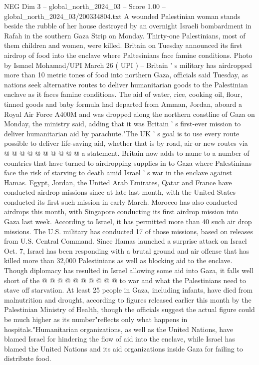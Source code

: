 \begin{textsample}{NEG Dim 3 – global\_north\_2024\_03 – Score 1.00 – global\_north\_2024\_03/200334804.txt}  \label{ex:f3_neg_170}
A wounded Palestinian woman stands beside the rubble of her house destroyed by an overnight Israeli bombardment in Rafah in the southern Gaza Strip on Monday.
Thirty-one Palestinians, most of them children and women, were killed.
Britain on Tuesday announced its first airdrop of food into the enclave where Paltesinians face famine conditions.
Photo by Ismael Mohamad/UPI March 26 ( UPI ) -- Britain ' s military has airdropped more than 10 metric tones of food into northern Gaza, officials said Tuesday, as nations seek alternative routes to deliver humanitarian goods to the Palestinian enclave as it faces famine conditions.
The aid of water, rice, cooking oil, flour, tinned goods and baby formula had departed from Amman, Jordan, aboard a Royal Air Force A400M and was dropped along the northern coastline of Gaza on Monday, the ministry said, adding that it was Britain ' s first-ever mission to deliver humanitarian aid by parachute."The UK ' s goal is to use every route possible to deliver life-saving aid, whether that is by road, air or new routes via @ @ @ @ @ @ @ @ @ @ a statement.
Britain now adds to name to a number of countries that have turned to airdropping supplies in to Gaza where Palestinians face the risk of starving to death amid Israel ' s war in the enclave against Hamas.
Egypt, Jordan, the United Arab Emirates, Qatar and France have conducted airdrop missions since at late last month, with the United States conducted its first such mission in early March.
Morocco has also conducted airdrops this month, with Singapore conducting its first airdrop mission into Gaza last week.
According to Israel, it has permitted more than 40 such air drop missions.
The U.S. military has conducted 17 of those missions, based on releases from U.S.
Central Command.
Since Hamas launched a surprise attack on Israel Oct. 7, Israel has been responding with a brutal ground and air offense that has killed more than 32,000 Palestinians as well as blocking aid to the enclave.
Though diplomacy has resulted in Israel allowing some aid into Gaza, it falls well short of the @ @ @ @ @ @ @ @ @ @ to war and what the Palestinians need to stave off starvation.
At least 25 people in Gaza, including infants, have died from malnutrition and drought, according to figures released earlier this month by the Palestinian Ministry of Health, though the officials suggest the actual figure could be much higher as its number"reflects only what happens in hospitals."Humanitarian organizations, as well as the United Nations, have blamed Israel for hindering the flow of aid into the enclave, while Israel has blamed the United Nations and its aid organizations inside Gaza for failing to distribute food.

\end{textsample}
